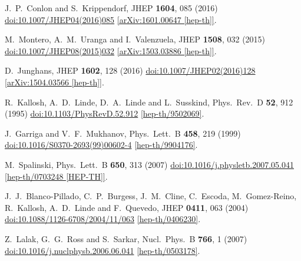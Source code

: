 \documentclass[11pt]{article}
\begin{document}
\begin{thebibliography}{99}
  J.~P.~Conlon and S.~Krippendorf,
  JHEP {\bf 1604}, 085 (2016)
  \href{https://dx.doi.org/10.1007/JHEP04(2016)085}{doi:10.1007/JHEP04(2016)085}
  \href{https://arxiv.org/abs/1601.00647}{[arXiv:1601.00647 [hep-th]]}.

  M.~Montero, A.~M.~Uranga and I.~Valenzuela,
  JHEP {\bf 1508}, 032 (2015)
  \href{https://dx.doi.org/10.1007/JHEP08(2015)032}{doi:10.1007/JHEP08(2015)032}
  \href{https://arxiv.org/abs/1503.03886}{[arXiv:1503.03886 [hep-th]]}.

  D.~Junghans,
  JHEP {\bf 1602}, 128 (2016)
  \href{https://dx.doi.org/10.1007/JHEP02(2016)128}{doi:10.1007/JHEP02(2016)128}
  \href{https://arxiv.org/abs/1504.03566}{[arXiv:1504.03566 [hep-th]]}.

  R.~Kallosh, A.~D.~Linde, D.~A.~Linde and L.~Susskind,
  Phys.\ Rev.\ D {\bf 52}, 912 (1995)
  \href{https://dx.doi.org/10.1103/PhysRevD.52.912}{doi:10.1103/PhysRevD.52.912}
  \href{https://arxiv.org/abs/hep-th/9502069}{[hep-th/9502069]}.

  J.~Garriga and V.~F.~Mukhanov,
  Phys.\ Lett.\ B {\bf 458}, 219 (1999)
  \href{https://dx.doi.org/10.1016/S0370-2693(99)00602-4}{doi:10.1016/S0370-2693(99)00602-4}
  \href{https://arxiv.org/abs/hep-th/9904176}{[hep-th/9904176]}.

  M.~Spalinski,
  Phys.\ Lett.\ B {\bf 650}, 313 (2007)
  \href{https://dx.doi.org/10.1016/j.physletb.2007.05.041}{doi:10.1016/j.physletb.2007.05.041}
  \href{https://arxiv.org/abs/hep-th/0703248}{[hep-th/0703248 [HEP-TH]]}.

  J.~J.~Blanco-Pillado, C.~P.~Burgess, J.~M.~Cline, C.~Escoda, M.~Gomez-Reino, R.~Kallosh, A.~D.~Linde and F.~Quevedo,
  JHEP {\bf 0411}, 063 (2004)
  \href{https://dx.doi.org/10.1088/1126-6708/2004/11/063}{doi:10.1088/1126-6708/2004/11/063}
  \href{https://arxiv.org/abs/hep-th/0406230}{[hep-th/0406230]}.

  Z.~Lalak, G.~G.~Ross and S.~Sarkar,
  Nucl.\ Phys.\ B {\bf 766}, 1 (2007)
  \href{https://dx.doi.org/10.1016/j.nuclphysb.2006.06.041}{doi:10.1016/j.nuclphysb.2006.06.041}
  \href{https://arxiv.org/abs/hep-th/0503178}{[hep-th/0503178]}.


\end{thebibliography}
\end{document}
